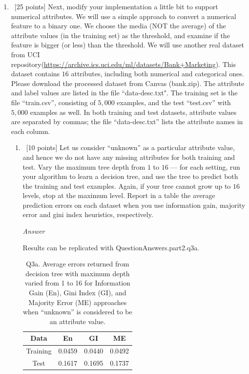 \documentclass[12pt, fullpage,letterpaper]{article}
\begin{document}
\begin{enumerate}
\begin{enumerate}
\end{enumerate}


\item~[25 points] Next, modify your implementation a little bit to support numerical attributes. We will use a simple approach to convert a numerical feature to a binary one. We choose the media (NOT the average) of the attribute values (in the training set) as the threshold, and examine if the feature is bigger (or less) than the threshold. We will use another real dataset from UCI repository(\url{https://archive.ics.uci.edu/ml/datasets/Bank+Marketing}). This dataset contains $16$ attributes, including both numerical and categorical ones. Please download the processed dataset from Canvas (bank.zip).  The attribute and label values are listed in the file ``data-desc.txt". The training set is the file ``train.csv'', consisting of $5,000$ examples, and the test  ``test.csv'' with $5,000$ examples as well.  In both training and test datasets, attribute values are separated by commas; the file ``data-desc.txt''  lists the attribute names in each column. 
\begin{enumerate}
	\item~[10 points] Let us consider ``unknown'' as a particular attribute value, and hence we do not have any missing attributes for both training and test. Vary the maximum  tree depth from $1$ to $16$ --- for each setting, run your algorithm to learn a decision tree, and use the tree to  predict both the training  and test examples. Again, if your tree cannot grow up to $16$ levels, stop at the maximum level. Report in a table the average prediction errors on each dataset when you use information gain, majority error and gini index heuristics, respectively.
	
	\emph{Answer}
	
	Results can be replicated with QuestionAnswers.part2.q3a.
	
	\begin{table}[h]
    	\centering
    	\begin{tabular}{c|ccc}
    		Data & En & GI & ME \\ 
    		\hline\hline
    		Training &  0.0459 & 0.0440 & 0.0492 \\ \hline
    		Test &  0.1617 & 0.1695 & 0.1737 \\ \hline
    	\end{tabular}
    	\caption{Q3a. Average errors returned from decision tree with maximum depth varied from 1 to 16 for Information Gain (En), Gini Index (GI), and Majority Error (ME) approaches when ``unknown'' is considered to be an attribute value.}
    \end{table}
	

\end{enumerate}
\end{enumerate}
\end{document}
